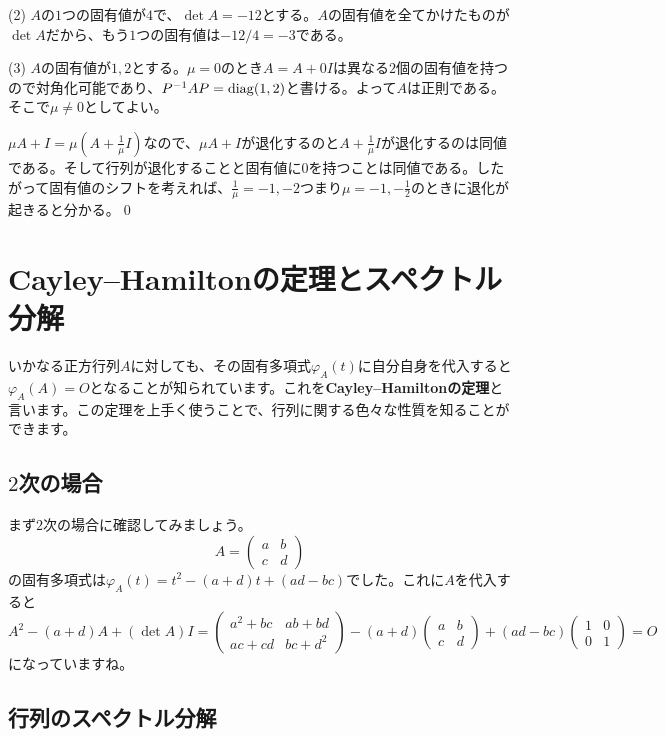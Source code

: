 \noindent (2) $A$の$1$つの固有値が$4$で、$\det A = -12$とする。$A$の固有値を全てかけたものが$\det A$だから、もう$1$つの固有値は$-12/4 = -3$である。

\noindent (3) $A$の固有値が$1, 2$とする。$\mu = 0$のとき$A = A + 0I$は異なる$2$個の固有値を持つので対角化可能であり、$P^{-1} A P = \operatorname{diag}(1, 2)$と書ける。よって$A$は正則である。そこで$\mu \neq 0$としてよい。

$\mu A + I = \mu (A + \frac{1}{\mu}I)$なので、$\mu A + I$が退化するのと$A + \frac{1}{\mu}I$が退化するのは同値である。そして行列が退化することと固有値に$0$を持つことは同値である。したがって固有値のシフトを考えれば、$\frac{1}{\mu} = -1, -2$つまり$\mu = -1, -\frac{1}{2}$のときに退化が起きると分かる。\qed

\section{Cayley--Hamiltonの定理とスペクトル分解}

いかなる正方行列$A$に対しても、その固有多項式$\varphi_A(t)$に自分自身を代入すると$\varphi_A(A) = O$となることが知られています。これを\textbf{Cayley--Hamiltonの定理}と言います。この定理を上手く使うことで、行列に関する色々な性質を知ることができます。

\subsection{$2$次の場合}

まず$2$次の場合に確認してみましょう。
\[
A = 
\begin{pmatrix}
a & b \\
c & d
\end{pmatrix}
\]
の固有多項式は$\varphi_A(t) = t^2 - (a + d)t + (ad - bc)$でした。これに$A$を代入すると
\[
A^2 - (a + d)A + (\det A)I
= 
\begin{pmatrix}
a^2 + bc & ab + bd \\
ac + cd & bc + d^2
\end{pmatrix}
- (a + d)
\begin{pmatrix}
a & b \\
c & d
\end{pmatrix}
+ (ad - bc)
\begin{pmatrix}
1 & 0 \\
0 & 1
\end{pmatrix}
= O
\]
になっていますね。

\subsection{行列のスペクトル分解}


